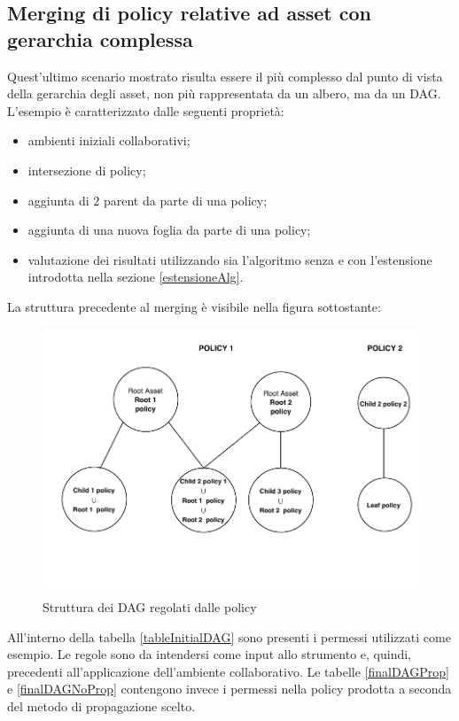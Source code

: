 \documentclass[12pt,a4paper,twoside]{book}
\begin{document}
\subsection{Merging di policy relative ad asset con gerarchia complessa}
Quest'ultimo scenario mostrato risulta essere il più complesso dal punto di vista della gerarchia degli asset, non più rappresentata da un albero, ma da un DAG. L'esempio è caratterizzato dalle seguenti proprietà:
\begin{itemize}
\item ambienti iniziali collaborativi;
\item intersezione di policy;
\item aggiunta di 2 parent da parte di una policy;
\item aggiunta di una nuova foglia da parte di una policy;
\item valutazione dei risultati utilizzando sia l'algoritmo senza e con l'estensione introdotta nella sezione \ref{estensioneAlg}.
\end{itemize}
La struttura precedente al merging è visibile nella figura sottostante:
\begin{figure}[H]
\centering
\includegraphics[scale=.70]{../immagini/DAGExample.pdf}
\caption{Struttura dei DAG regolati dalle policy}
\label{DAGStructureExample}
\end{figure}
All'interno della tabella \ref{tableInitialDAG} sono presenti i permessi utilizzati come esempio. Le regole sono da intendersi come input allo strumento e, quindi, precedenti all'applicazione dell'ambiente collaborativo.  Le tabelle \ref{finalDAGProp} e \ref{finalDAGNoProp} contengono invece i permessi nella policy prodotta a seconda del metodo di propagazione scelto.
\end{document}
